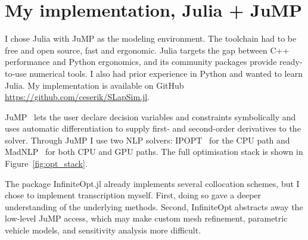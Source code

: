 \chapter{My implementation, Julia + JuMP}
\label{ch:implementation}

I chose Julia with JuMP as the modeling environment. The toolchain had to be free and open source, fast and ergonomic. Julia targets the gap between C++ performance and Python ergonomics, and its community packages provide ready-to-use numerical tools. I also had prior experience in Python and wanted to learn Julia. My implementation is available on GitHub \url{https://github.com/ceserik/SLapSim.jl}.

JuMP~\cite{Lubin2023} lets the user declare decision variables and constraints symbolically and uses automatic differentiation to supply first- and second-order derivatives to the solver. Through JuMP I use two NLP solvers: IPOPT~\cite{wachter_implementation_2006} for the CPU path and MadNLP~\cite{shin2021graph,shin2024accelerating} for both CPU and GPU paths. The full optimisation stack is shown in Figure~\ref{fig:opt_stack}.

The package InfiniteOpt.jl already implements several collocation schemes, but I chose to implement transcription myself. First, doing so gave a deeper understanding of the underlying methods. Second, InfiniteOpt abstracts away the low-level JuMP access, which may make custom mesh refinement, parametric vehicle models, and sensitivity analysis more difficult.


